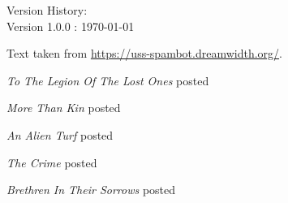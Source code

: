 \begin{center}

{\large Version History:}\\[\baselineskip]

\vspace*{\fill}
Version 1.0.0 : \today

\majorchange

Text taken from \url{https://uss-spambot.dreamwidth.org/}.

\scenechange

\textit{To The Legion Of The Lost Ones} posted 

\textit{More Than Kin} posted 

\textit{An Alien Turf} posted 

\textit{The Crime} posted 

\textit{Brethren In Their Sorrows} posted  
\end{center}